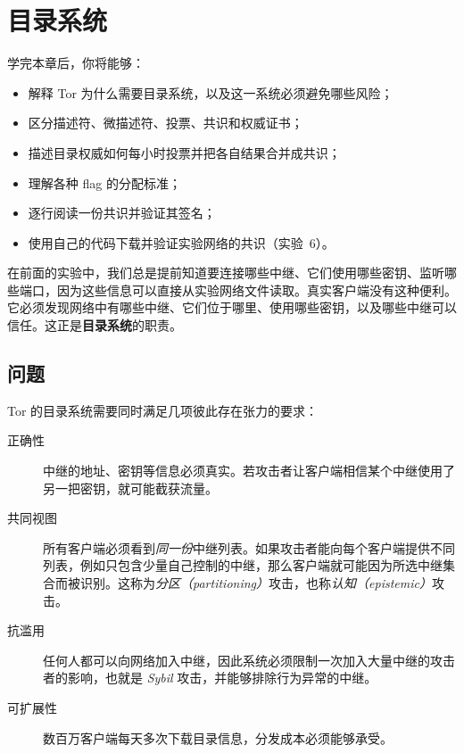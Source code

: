 \chapter{目录系统}\label{cap:12-directory}

\begin{obiettivi}
学完本章后，你将能够：
\begin{itemize}[nosep]
  \item 解释 Tor 为什么需要目录系统，以及这一系统必须避免哪些风险；
  \item 区分描述符、微描述符、投票、共识和权威证书；
  \item 描述目录权威如何每小时投票并把各自结果合并成共识；
  \item 理解各种 flag 的分配标准；
  \item 逐行阅读一份共识并验证其签名；
  \item 使用自己的代码下载并验证实验网络的共识（实验~6）。
\end{itemize}
\end{obiettivi}

在前面的实验中，我们总是提前知道要连接哪些中继、它们使用哪些密钥、监听哪些端口，因为这些信息可以直接从实验网络文件读取。真实客户端没有这种便利。它必须发现网络中有哪些中继、它们位于哪里、使用哪些密钥，以及哪些中继可以信任。这正是\textbf{目录系统}的职责。

\section{问题}\label{sec:dir-problema}

Tor 的目录系统需要同时满足几项彼此存在张力的要求：
\begin{description}
  \item[正确性] 中继的地址、密钥等信息必须真实。若攻击者让客户端相信某个中继使用了另一把密钥，就可能截获流量。
  \item[共同视图] 所有客户端必须看到\emph{同一份}中继列表。如果攻击者能向每个客户端提供不同列表，例如只包含少量自己控制的中继，那么客户端就可能因为所选中继集合而被识别。这称为\emph{分区（partitioning）}攻击，也称\emph{认知（epistemic）}攻击。
  \item[抗滥用] 任何人都可以向网络加入中继，因此系统必须限制一次加入大量中继的攻击者的影响，也就是 \emph{Sybil} 攻击，并能够排除行为异常的中继。
  \item[可扩展性] 数百万客户端每天多次下载目录信息，分发成本必须能够承受。
\end{description}

